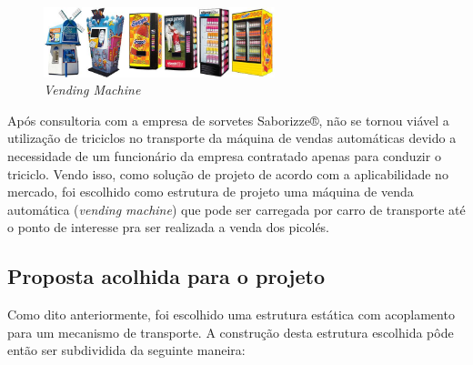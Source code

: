 \begin{figure}[H]
	\centering
    \includegraphics[width=0.6\textwidth]{figuras/machinewrapsheader}
    \caption{\textit{Vending Machine}}
    \label{fig:machinewrapsheader}
\end{figure}

Após consultoria com a empresa de sorvetes Saborizze®, não se tornou viável a utilização de triciclos no transporte da máquina de vendas automáticas devido a necessidade de um funcionário da empresa contratado apenas para conduzir o triciclo. Vendo isso, como solução de projeto de acordo com a aplicabilidade no mercado, foi escolhido como estrutura de projeto uma máquina de venda automática (\textit{vending machine}) que pode ser carregada por carro de transporte até o ponto de interesse pra ser realizada a venda dos picolés.

\subsection{Proposta acolhida para o projeto}

Como dito anteriormente, foi escolhido uma estrutura estática com acoplamento para um mecanismo de transporte. A construção desta estrutura escolhida pôde então ser subdividida da seguinte maneira:
 
